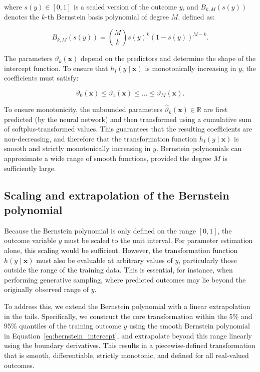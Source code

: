 where $s(y) \in [0, 1]$ is a scaled version of the outcome $y$, and $B_{k, M}(s(y))$ denotes the $k$-th Bernstein basis polynomial of degree $M$, defined as:

\[
B_{k, M}(s(y)) = \binom{M}{k} s(y)^k (1 - s(y))^{M - k}.
\]

The parameters $\vartheta_k(\mathbf{x})$ depend on the predictors and determine the shape of the intercept function. To ensure that $h_I(y \mid \mathbf{x})$ is monotonically increasing in $y$, the coefficients must satisfy:

\[
\vartheta_0(\mathbf{x}) \leq \vartheta_1(\mathbf{x}) \leq \dots \leq \vartheta_M(\mathbf{x}).
\]

To ensure monotonicity, the unbounded parameters $\hat{\vartheta}_k(\mathbf{x}) \in \mathbb{R}$ are first predicted (by the neural network) and then transformed using a cumulative sum of softplus-transformed values. This guarantees that the resulting coefficients are non-decreasing, and therefore that the transformation function $h_I(y \mid \mathbf{x})$ is smooth and strictly monotonically increasing in $y$.
Bernstein polynomials can approximate a wide range of smooth functions, provided the degree $M$ is sufficiently large.



\subsection{Scaling and extrapolation of the Bernstein polynomial}

Because the Bernstein polynomial is only defined on the range $[0, 1]$, the outcome variable $y$ must be scaled to the unit interval. For parameter estimation alone, this scaling would be sufficient. However, the transformation function $h(y \mid \mathbf{x})$ must also be evaluable at arbitrary values of $y$, particularly those outside the range of the training data. This is essential, for instance, when performing generative sampling, where predicted outcomes may lie beyond the originally observed range of $y$.

To address this, we extend the Bernstein polynomial with a linear extrapolation in the tails. Specifically, we construct the core transformation within the 5\% and 95\% quantiles of the training outcome $y$ using the smooth Bernstein polynomial in Equation~\ref{eq:bernstein_intercept}, and extrapolate beyond this range linearly using the boundary derivatives. This results in a piecewise-defined transformation that is smooth, differentiable, strictly monotonic, and defined for all real-valued outcomes.

